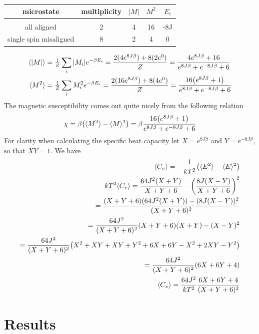 \documentclass[a4paper, 12pt]{article}
\newcommand{\expect}[1]{\langle #1 \rangle}
\begin{document}
{		\begin{center}
		\begin{tabular}{c c c c c}
			microstate	&	multiplicity	&	$|M|$	&	$M^2$ 	&	$E_i$\\
			\hline \\
			all aligned	&	2	&	4	&	16	&	-8J\\
			single spin misaligned & 8	&	2	&	4	&	0
		\end{tabular}
		\end{center}

		\begin{align*}
			\langle \abs{M} \rangle & = \tfrac{1}{Z} \sum_{i}\abs{M_i}e^{-\beta E_i} = \frac{2(4e^{8J\beta}) + 8(2e^{0})}{Z} = 
			\frac{4e^{8J\beta}+16}{e^{8J\beta}+e^{-8J\beta}+6}\\
			\langle M^2 \rangle & = \tfrac{1}{Z} \sum_{i}M_i^2e^{-\beta E_i} = \frac{2(16e^{8J\beta}) + 8(4e^{0})}{Z} = 
			\frac{16\qty(e^{8J\beta}+1)}{e^{8J\beta}+e^{-8J\beta}+6}\\
		\end{align*}
		The magnetic susceptibility comes out quite nicely from the following relation
		\begin{equation*}
			\chi = \beta \qty( \expect{M^2} - \expect{M}^2 ) = \beta \frac{16\qty(e^{8J\beta}+1)}{e^{8J\beta}+e^{-8J\beta}+6}
		\end{equation*}
		For clarity when calculating the specific heat capacity let $X = e^{8J\beta}$ and $Y = e^{-8J\beta}$, so that $XY=1$.
		We have 
		\begin{align*}
			\expect{C_v}  = -\frac{1}{kT^2}\qty( \expect{E^2}-\expect{E}^2 )\\
			kT^2\expect{C_v}  = \frac{64J^2(X+Y)}{X+Y+6} - \qty(\frac{8J(X-Y)}{X+Y+6})^2 \\
			 = \frac{(X+Y+6)(64J^2(X+Y)) - (8J(X-Y))^2}{(X+Y+6)^2}\\
			 = \frac{64J^2}{(X+Y+6)^2} (X+Y+6)(X+Y)-(X-Y)^2\\
			 = \frac{64J^2}{(X+Y+6)^2} \qty( X^2+XY+XY+Y^2+6X+6Y-X^2+2XY-Y^2 )\\
			 = \frac{64J^2}{(X+Y+6)^2} \qty( 6X + 6Y + 4 )\\
			\expect{C_v} = \frac{64J^2}{kT^2} \frac{6X + 6Y + 4}{(X+Y+6)^2}
		\end{align*}

	
\newpage
\section{Results}
}
\end{document}
